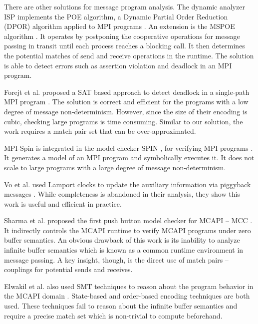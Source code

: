 There are other solutions for message program analysis.
The dynamic analyzer ISP implements the POE algorithm, a Dynamic Partial Order Reduction (DPOR) algorithm \cite{DBLP:conf/popl/FlanaganG05} applied to MPI programs \cite{DBLP:conf/ppopp/VakkalankaSGK08}. An extension is the MSPOE algorithm \cite{DBLP:conf/sbmf/SharmaGB12}. It operates by postponing the cooperative operations for message passing in transit until each process reaches a blocking call. It then determines the potential matches of send and receive operations in the runtime. The solution is able to detect errors such as assertion violation and deadlock in an MPI program.

Forejt et al. proposed a SAT based approach to detect deadlock in a single-path MPI program \cite{DBLP:conf/fm/ForejtKNS14}. The solution is correct and efficient for the programs with a low degree of message non-determinism. However, since the size of their encoding is cubic, checking large programs is time consuming. Similar to our solution, the work requires a match pair set that can be over-approximated.


MPI-Spin is integrated in the model checker SPIN \cite{DBLP:journals/tse/Holzmann97}, for verifying MPI programs \cite{DBLP:conf/vmcai/Siegel07,DBLP:conf/pvm/Siegel07}. It generates a model of an MPI program and symbolically executes it. It does not scale to large programs with a large degree of message non-determinism.

Vo et al. used Lamport clocks to update the auxiliary information via piggyback messages \cite{DBLP:conf/sc/VoAGSSB10,DBLP:conf/IEEEpact/VoGKSSB11}. While completeness is abandoned in their analysis, they show this work is useful and efficient in practice. 

Sharma et al. proposed the first push button model checker for MCAPI -- MCC \cite{DBLP:conf/fmcad/SharmaGMH09}. It indirectly controls the MCAPI runtime to verify MCAPI programs under zero buffer semantics. An obvious drawback of this work is its inability to analyze infinite buffer semantics which is known as a common runtime environment in message passing. A key insight, though, is the direct use of match pairs -- couplings for potential sends and receives.

Elwakil et al. also used SMT techniques to reason about the program behavior in the MCAPI domain \cite{DBLP:conf/issta/ElwakilY10,DBLP:conf/atva/ElwakilYW10}. State-based and order-based encoding techniques are both used. These techniques fail to reason about the infinite buffer semantics and require a precise match set which is non-trivial to compute beforehand.

